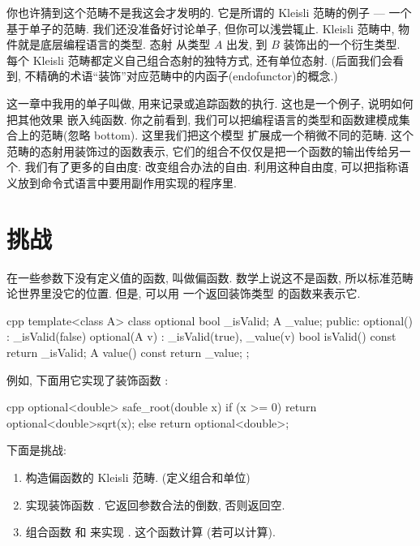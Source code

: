 你也许猜到这个范畴不是我这会才发明的. 它是所谓的 Kleisli 范畴的例子 --- 一个基于单子的范畴.
我们还没准备好讨论单子, 但你可以浅尝辄止. Kleisli 范畴中, 物件就是底层编程语言的类型. 态射
从类型 $A$ 出发, 到 $B$ 装饰出的一个衍生类型. 每个 Kleisli 范畴都定义自己组合态射的独特方式,
还有单位态射. (后面我们会看到, 不精确的术语``装饰''对应范畴中的内函子(endofunctor)的概念.)

这一章中我用的单子叫做, 用来记录或追踪函数的执行. 这也是一个例子, 说明如何把其他效果
嵌入纯函数. 你之前看到, 我们可以把编程语言的类型和函数建模成集合上的范畴(忽略 bottom). 这里我们把这个模型
扩展成一个稍微不同的范畴. 这个范畴的态射用装饰过的函数表示, 它们的组合不仅仅是把一个函数的输出传给另一个.
我们有了更多的自由度: 改变组合办法的自由. 利用这种自由度, 可以把指称语义放到命令式语言中要用副作用实现的程序里.

\section{挑战}

在一些参数下没有定义值的函数, 叫做偏函数. 数学上说这不是函数, 所以标准范畴论世界里没它的位置. 但是, 可以用
一个返回装饰类型  的函数来表示它.

\begin{snip}{cpp}
template<class A> class optional {
    bool _isValid;
    A _value;
public:
    optional()    : _isValid(false) {}
    optional(A v) : _isValid(true), _value(v) {}
    bool isValid() const { return _isValid; }
    A value() const { return _value; }
};
\end{snip}
例如, 下面用它实现了装饰函数 :

\begin{snip}{cpp}
optional<double> safe_root(double x) {
    if (x >= 0) return optional<double>{sqrt(x)};
    else return optional<double>{};
}
\end{snip}
下面是挑战:

\begin{enumerate}
  \tightlist
  \item
        构造偏函数的 Kleisli 范畴. (定义组合和单位)
  \item
        实现装饰函数 . 它返回参数合法的倒数, 否则返回空.
  \item
        组合函数  和  来实现 .
        这个函数计算  (若可以计算).
\end{enumerate}
